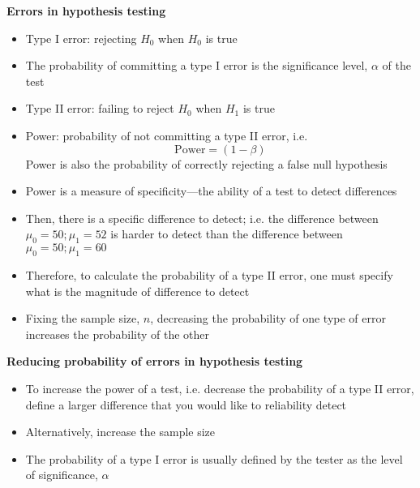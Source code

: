 \documentclass[a4paper]{article}
\newcommand{\heading}[1]{{\small\textbf{#1}}}
\begin{document}
\begin{multicols*}{4}
\heading{Errors in hypothesis testing}
\begin{itemize} \itemsep -0.5em
    \item Type I error: rejecting $H_0$ when $H_0$ is true
    \item The probability of committing a type I error is the
        significance level, $\alpha$ of the test
    \item Type II error: failing to reject $H_0$ when $H_1$ is true
    \item Power: probability of not committing a type II error, i.e.
        $$\mathrm{Power} = (1-\beta)$$
        Power is also the probability of correctly rejecting a false
        null hypothesis
    \item Power is a measure of specificity---the ability of a test to 
        detect differences
    \item Then, there is a specific difference to detect; i.e. the
        difference between $\mu_0 = 50; \mu_1 = 52$ is harder to detect
        than the difference between $\mu_0 = 50; \mu_1 = 60$
    \item Therefore, to calculate the probability of a type II error,
        one must specify what is the magnitude of difference to detect
    \item Fixing the sample size, $n$, decreasing the probability of one
        type of error increases the probability of the other
\end{itemize}

\heading{Reducing probability of errors in hypothesis testing}
\begin{itemize} \itemsep -0.5em
    \item To increase the power of a test, i.e. decrease the 
        probability of a type II error, define a larger difference
        that you would like to reliability detect
    \item Alternatively, increase the sample size
    \item The probability of a type I error is usually defined by the
        tester as the level of significance, $\alpha$
\end{itemize}


\end{multicols*}
\end{document}
